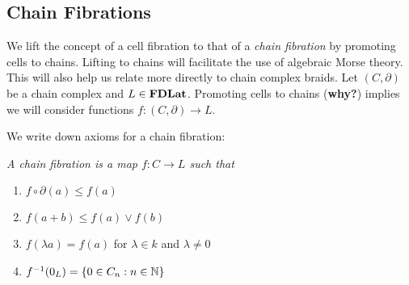 %
%
%
%
%
%


\subsection{Chain Fibrations}

We lift the concept of a cell fibration to that of a {\em chain fibration} by promoting cells to chains.  Lifting to chains will facilitate the use of algebraic Morse theory.  This will also help us relate more directly to chain complex braids.  Let $(C,\partial)$ be a chain complex and $L\in {\bf FDLat}$.  Promoting cells to chains ({\bf why?}) implies we will consider functions $f:(C,\partial)\to L$.  

We write down axioms for a chain fibration:

\begin{defn}
{\em 
A {\em chain fibration} is a map $f:C\to L$ such that
\begin{enumerate}
\item $f\circ \partial(a) \leq f(a)$

\item $f(a+ b) \leq f(a)\vee f(b)$

\item $f(\lambda a) = f(a)$ for $\lambda\in k$ and $\lambda \neq 0$ 

\item $f^{-1}(0_L) = \{0 \in C_n: n\in {\mathbb{N}}\}$
\end{enumerate}
}
\end{defn}

